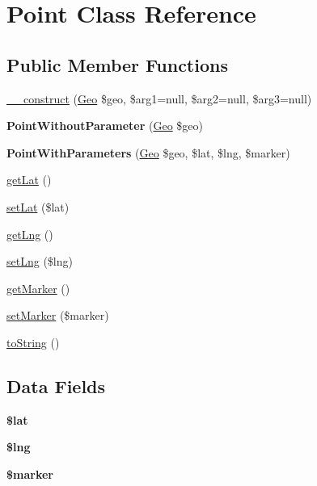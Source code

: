 \hypertarget{class_point}{\section{Point Class Reference}
\label{class_point}
}
\subsection*{Public Member Functions}
\begin{DoxyCompactItemize}
\item 
\hyperlink{class_point_a93a33b81f5f5807d670888c5b1eb721b}{\+\_\+\+\_\+construct} (\hyperlink{class_geo}{Geo} \$geo, \$arg1=null, \$arg2=null, \$arg3=null)
\item 
\hypertarget{class_point_af8df251eef51ebf2619f5e125b7a5744}{{\bfseries Point\+Without\+Parameter} (\hyperlink{class_geo}{Geo} \$geo)}\label{class_point_af8df251eef51ebf2619f5e125b7a5744}

\item 
\hypertarget{class_point_a5ed1e48e735fe646c44122ebf3f98abc}{{\bfseries Point\+With\+Parameters} (\hyperlink{class_geo}{Geo} \$geo, \$lat, \$lng, \$marker)}\label{class_point_a5ed1e48e735fe646c44122ebf3f98abc}

\item 
\hyperlink{class_point_ace4646478052fb05a9226af2f1db07fa}{get\+Lat} ()
\item 
\hyperlink{class_point_a25b3098601cade6a6a1067a1dfae110b}{set\+Lat} (\$lat)
\item 
\hyperlink{class_point_a438a7c3b088658ca987ee34416992249}{get\+Lng} ()
\item 
\hyperlink{class_point_a24f91fc3534738f0839a11cb2306b142}{set\+Lng} (\$lng)
\item 
\hyperlink{class_point_a4a04a0eb21cd8fe73a9e02ac94824b48}{get\+Marker} ()
\item 
\hyperlink{class_point_ad0f2f172f10d36d59a41310c41d88f6a}{set\+Marker} (\$marker)
\item 
\hyperlink{class_point_a5558c5d549f41597377fa1ea8a1cefa3}{to\+String} ()
\end{DoxyCompactItemize}
\subsection*{Data Fields}
\begin{DoxyCompactItemize}
\item 
\hypertarget{class_point_af498b42b83afed4dfe0af05fd802776c}{{\bfseries \$lat}}\label{class_point_af498b42b83afed4dfe0af05fd802776c}

\item 
\hypertarget{class_point_ab27bfa6a9380a8d89e1a8e001b276410}{{\bfseries \$lng}}\label{class_point_ab27bfa6a9380a8d89e1a8e001b276410}

\item 
\hypertarget{class_point_aad34fbf53cda6bd8a3a9c46764d534fa}{{\bfseries \$marker}}\label{class_point_aad34fbf53cda6bd8a3a9c46764d534fa}

\end{DoxyCompactItemize}


